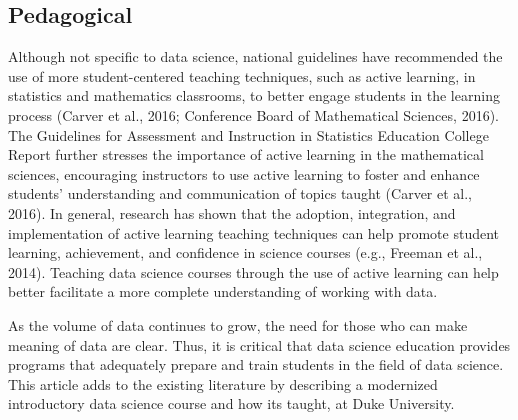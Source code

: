 \documentclass[
  12pt]{article}
\begin{document}
\hypertarget{sec-ped}{%
\subsection{Pedagogical}\label{sec-ped}}

Although not specific to data science, national guidelines have
recommended the use of more student-centered teaching techniques, such
as active learning, in statistics and mathematics classrooms, to better
engage students in the learning process (Carver et al., 2016; Conference
Board of Mathematical Sciences, 2016). The Guidelines for Assessment and
Instruction in Statistics Education College Report further stresses the
importance of active learning in the mathematical sciences, encouraging
instructors to use active learning to foster and enhance students'
understanding and communication of topics taught (Carver et al., 2016).
In general, research has shown that the adoption, integration, and
implementation of active learning teaching techniques can help promote
student learning, achievement, and confidence in science courses (e.g.,
Freeman et al., 2014). Teaching data science courses through the use of
active learning can help better facilitate a more complete understanding
of working with data.

As the volume of data continues to grow, the need for those who can make
meaning of data are clear. Thus, it is critical that data science
education provides programs that adequately prepare and train students
in the field of data science. This article adds to the existing
literature by describing a modernized introductory data science course
and how its taught, at Duke University.


  
\end{document}
